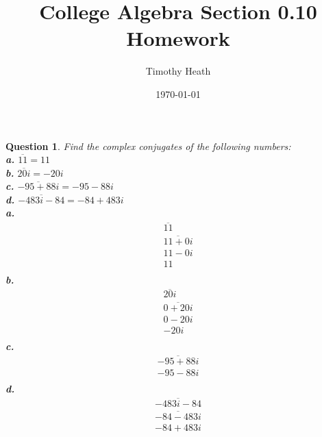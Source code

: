 \documentclass{amsart}
\title{College Algebra Section 0.10 Homework}
\author{Timothy Heath}
\date{\today}
\newtheorem{question}{Question}
\begin{document}
	\maketitle
	\newpage
	\begin{question}
		Find the complex conjugates of the following numbers:\\
		\textbf{a.} $\overline{11}=\boxed{11}$\\
		\textbf{b.} $\overline{20i}=\boxed{-20i}$\\
		\textbf{c.} $\overline{-95+88i}=\boxed{-95-88i}$\\
		\textbf{d.} $\overline{-483i-84}=\boxed{-84+483i}$\\
		\textbf{a.}\\
		\[
		\begin{aligned}
			\overline{11}\\
			\overline{11+0i}\\
			11-0i\\
			11\\
		\end{aligned}
		\]
		\textbf{b.}\\
		\[
		\begin{aligned}
			\overline{20i}\\
			\overline{0+20i}\\
			0-20i\\
			-20i\\
		\end{aligned}
		\]
		\textbf{c.}\\
		\[
		\begin{aligned}
			\overline{-95+88i}\\
			-95-88i\\
		\end{aligned}
		\]
		\textbf{d.}\\
		\[
		\begin{aligned}
			\overline{-483i-84}\\
			\overline{-84-483i}\\
			-84+483i\\
		\end{aligned}
		\]
	\end{question}
\end{document}
